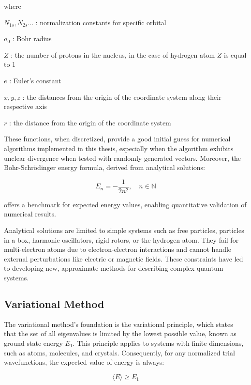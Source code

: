 \noindent where

\(N_{1s}, N_{2s}... \) : normalization constants for specific orbital

\(a_0 \) : Bohr radius

\(Z \) : the number of protons in the nucleus, in the case of hydrogen atom $Z$ is equal to 1

\(e \) : Euler's constant

\(x,y,z \) : the distances from the origin of the coordinate system along their respective axis

\(r \) : the distance from the origin of the coordinate system

These functions, when discretized, provide a good initial guess for numerical algorithms implemented in this thesis, especially when the algorithm exhibits unclear divergence when tested with randomly generated vectors. Moreover, the Bohr-Schrödinger energy formula, derived from analytical solutions:

\begin{equation}
	E_n = -\frac{1}{2n^2}, \quad n \in \mathbb{N}
\end{equation}

\noindent offers a benchmark for expected energy values, enabling quantitative validation of numerical results.

Analytical solutions are limited to simple systems such as free particles, particles in a box, harmonic oscillators, rigid rotors, or the hydrogen atom. They fail for multi-electron atoms due to electron-electron interactions and cannot handle external perturbations like electric or magnetic fields. These constraints have led to developing new, approximate methods for describing complex quantum systems.

\subsection{Variational Method}
The variational method's foundation is the variational principle, which states that the set of all eigenvalues is limited by the lowest possible value, known as ground state energy $E_1$. This principle applies to systems with finite dimensions, such as atoms, molecules, and crystals. Consequently, for any normalized trial wavefunctions, the expected value of energy is always:

\begin{equation}
	\langle E \rangle \geqslant E_1
\end{equation}

